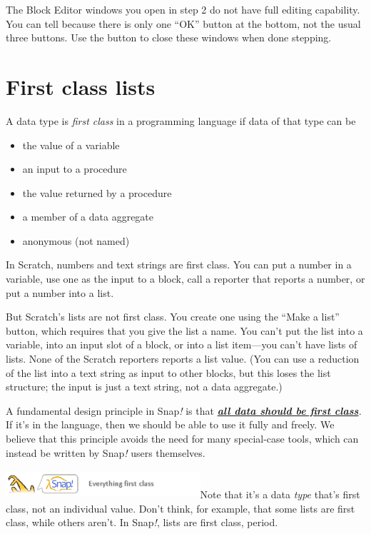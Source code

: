 The Block Editor windows you open in step 2 do not have full editing
capability. You can tell because there is only one ``OK'' button at the
bottom, not the usual three buttons. Use the button to close these
windows when done stepping.

\section{First class lists}\label{first-class-lists}

A data type is \emph{ﬁrst class} in a programming language if data of
that type can be

\begin{itemize}
\item
  the value of a variable
\item
  an input to a procedure
\item
  the value returned by a procedure
\item
  a member of a data aggregate
\item
  anonymous (not named)
\end{itemize}

In Scratch, numbers and text strings are ﬁrst class. You can put a
number in a variable, use one as the input to a block, call a reporter
that reports a number, or put a number into a list.

But Scratch's lists are not ﬁrst class. You create one using the ``Make
a list'' button, which requires that you give the list a name. You can't
put the list into a variable, into an input slot of a block, or into a
list item---you can't have lists of lists. None of the Scratch reporters
reports a list value. (You can use a reduction of the list into a text
string as input to other blocks, but this loses the list structure; the
input is just a text string, not a data aggregate.)

A fundamental design principle in Snap\emph{!} is that
\emph{\textbf{\ul{all data should be ﬁrst class}}.} If it's in the
language, then we should be able to use it fully and freely. We believe
that this principle avoids the need for many special-case tools, which
can instead be written by Snap\emph{!} users themselves.

\includegraphics[width=2.83958in,height=0.41597in]{media/image523.png}Note
that it's a data \emph{type} that's ﬁrst class, not an individual value.
Don't think, for example, that some lists are ﬁrst class, while others
aren't. In Snap\emph{!}, lists are ﬁrst class, period.

